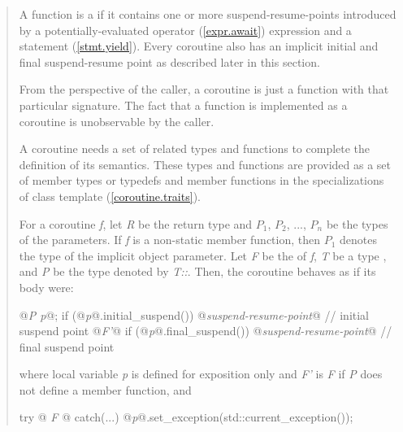 \begin{quote}
\pnum
A function is a  if it contains
one or more suspend-resume-points introduced by a potentially-evaluated  operator (\ref{expr.await}) expression and a  statement (\ref{stmt.yield}).
Every coroutine
also has an implicit initial and final suspend-resume point as described later in this section. 


\pnum
\enternote
From the perspective of the caller, a coroutine is just a function with that particular signature. The fact that a function is implemented as a coroutine is unobservable by the caller. 
\exitnote

\pnum
A coroutine needs a set of related types and functions
to complete the definition of its semantics.
These types and functions are provided as a set of member types or typedefs
and member functions in the specializations of class template
 (\ref{coroutine.traits}). 

\pnum
For a coroutine \textit{f}, let \textit{R} be the return type and $P_1$, $P_2$, ..., $P_n$
be the types of the parameters. If \textit{f} is a non-static member function, then $P_1$ denotes the type of the implicit object parameter. 
Let \textit{F} be the 
of \textit{f}, \textit{T} be a type , and \textit{P} be the type denoted by \textit{T::}. 
Then, the coroutine behaves as if its body were:
\begin{codeblock}
  {
     @\textit{P p}@;
     if (@\textit{p}@.initial_suspend()) {
       @\textit{suspend-resume-point}@ // initial suspend point
     }
     @\textit{F'}@
     if (@\textit{p}@.final_suspend()) {
       @\textit{suspend-resume-point}@ // final suspend point
     }
  }
\end{codeblock}
where local variable \textit{p} is 
defined for
exposition only and
\textit{F'} is \textit{F}
if \textit{P} does not define a  member function, 
and 
\begin{codeblock}
  try {@\textit{ F }@} catch(...) { @\textit{p}@.set_exception(std::current_exception()); }
\end{codeblock}


\end{quote}
